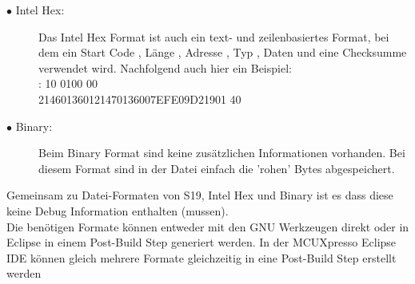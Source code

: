 \documentclass[a4paper, 8pt]{extarticle}
\begin{document}
\begin{multicols*}{3}
\begin{description}
		\item[$\bullet$ Intel Hex:]
		Das Intel Hex Format ist auch ein text- und zeilenbasiertes Format, bei
		dem ein Start Code , Länge , Adresse , Typ , Daten und eine Checksumme
		verwendet wird. Nachfolgend auch hier ein Beispiel:\\
		: 10 0100 00 \\214601360121470136007EFE09D21901 40
		\item[$\bullet$ Binary:] Beim Binary Format sind keine zusätzlichen Informationen vorhanden. Bei
		diesem Format sind in der Datei einfach die ’rohen’ Bytes abgespeichert.\newline 
	\end{description}	
	Gemeinsam zu Datei-Formaten von S19, Intel Hex und Binary ist es dass diese
	keine Debug Information enthalten (mussen).\\
	Die benötigen Formate können entweder mit den GNU Werkzeugen direkt
	oder in Eclipse in einem Post-Build Step generiert werden. In der MCUXpresso
	Eclipse IDE können gleich mehrere Formate gleichzeitig in eine Post-Build Step
	erstellt werden
	
	





\end{multicols*}
\end{document}
